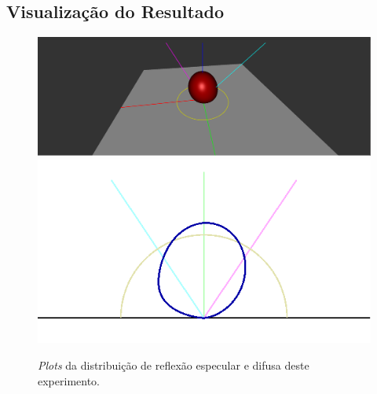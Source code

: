 \subsection{Visualização do Resultado}
\begin{figure}[H]
    \caption{\small{\textit{Plots} da distribuição de reflexão especular e difusa deste experimento.}}
    \label{fig-edwards-2006-plots}
    \vspace{42px}
  \includegraphics[width=\linewidth]{./Imagens/brdfs/edwards-2006-3D-plot}
\endminipage\hfill
{}
  \includegraphics[width=\linewidth]{./Imagens/brdfs/edwards-2006-polar-plot.png}
\endminipage\hfill
\end{figure}

